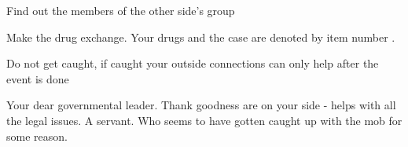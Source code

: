 \documentclass[blue]{guildcamp3}
\begin{document}
\begin{itemz}[Goals]
	\item Find out the members of the other side's group
	\item Make the drug exchange. Your drugs and the case are denoted by item number \iDrugsMagic{}.
	\item Do not get caught, if caught your outside connections can only help after the event is done
\end{itemz}

\begin{members}
	\member{\cNobleOne{\intro}} Your dear governmental leader. Thank goodness \cNobleOne{\they} are on your side - helps with all the legal issues. 
	\member{\cServant{\intro}} A servant. Who seems to have gotten caught up with the mob for some reason.
		
	\end{members}
\end{document}

